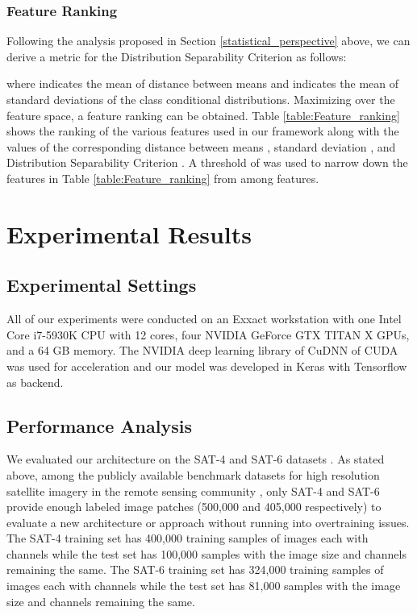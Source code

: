 \documentclass[]{interact}
\theoremstyle{plain}\newtheorem{theorem}{Theorem}[section]
\theoremstyle{definition}
\theoremstyle{remark}
\begin{document}
\subsubsection{Feature Ranking}\label{Section:feature_ranking}
Following the analysis proposed in Section \ref{statistical_perspective} above, we can derive a metric for the Distribution Separability Criterion as follows:

where  indicates the mean of distance between means and  indicates the mean of standard deviations of the class conditional distributions. Maximizing  over the feature space, a feature ranking can be obtained. Table \ref{table:Feature_ranking} shows the ranking of the various features used in our framework along with the values of the corresponding distance between means , standard deviation  , and Distribution Separability Criterion . A threshold of  was used to narrow down the  features in Table \ref{table:Feature_ranking} from among  features. 

\section{Experimental Results}
\subsection{Experimental Settings}

All of our experiments were conducted on  an Exxact workstation with one Intel Core i7-5930K CPU with 12 cores, four NVIDIA GeForce GTX TITAN X GPUs, and a 64 GB memory. The NVIDIA deep learning library of CuDNN of CUDA was used  for acceleration and our model was developed in Keras with  Tensorflow as backend.


\subsection{Performance Analysis}
We evaluated our architecture on the SAT-4 and SAT-6 datasets \citep{basu2015}. As stated above, among the publicly available benchmark datasets for high resolution satellite imagery in the remote sensing community \citep{ml}, only SAT-4 and SAT-6 provide enough labeled image patches (500,000 and 405,000 respectively) to evaluate a new architecture or approach without running into overtraining issues. The SAT-4 training set has 400,000 training samples of  images each with  channels \citep{basu2015} while the test set has 100,000 samples with the image size and channels remaining the same. The SAT-6 training set has 324,000 training samples of  images each with  channels \citep{basu2015} while the test set has 81,000 samples with the image size and channels remaining the same. 
\end{document}
